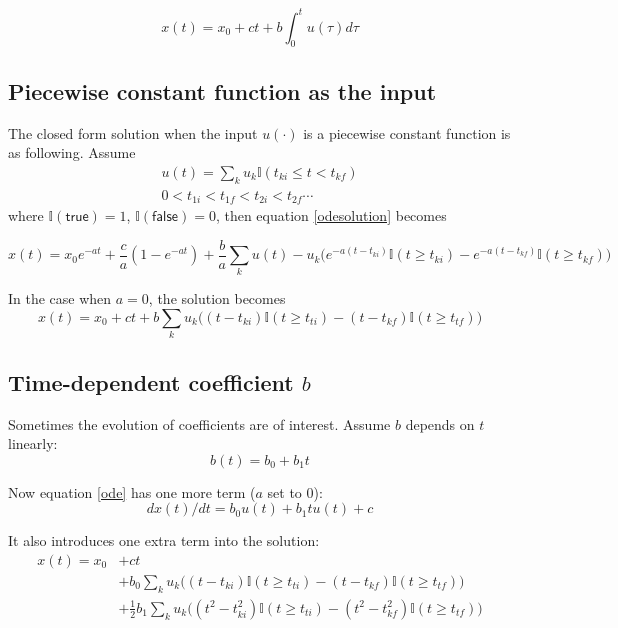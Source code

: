 \begin{equation}
	x(t) = x_0 + ct +  b \int_0^t u(\tau)d\tau
\end{equation}


\subsection{Piecewise constant function as the input}
The closed form solution when the input $u(\cdot)$ is a piecewise constant function is as following. Assume
\begin{equation}
	\begin{split}
u(t) = \sum_k u_k  \mathbb{I}(t_{ki}\leqslant t < t_{kf}) \\ 
0 < t_{1i} < t_{1f} < t_{2i} < t_{2f} \cdots
	\end{split}
\end{equation}
where $\mathbb{I}(\textsf{true}) = 1$, $\mathbb{I}(\textsf{false}) = 0$, then equation \ref{odesolution} becomes

\begin{equation}
	x(t) = x_0 e^{-at} + \frac{c}{a}(1-e^{-at}) + \frac{b}{a} \sum_k u(t) - u_k\bigg(e^{-a(t-t_{ki})}\mathbb{I}(t\geqslant t_{ki}) - e^{-a(t-t_{kf})}\mathbb{I}(t\geqslant t_{kf})\bigg)
\end{equation}

In the case when $a=0$, the solution becomes
\begin{equation}
	x(t) = x_0 + ct +  b \sum_k u_k\big( (t-t_{ki}) \mathbb{I}(t\geqslant t_{ti}) - (t-t_{kf}) \mathbb{I}(t\geqslant t_{tf})\big)
\end{equation}

\subsection{Time-dependent coefficient $b$}

Sometimes the evolution of coefficients are of interest. Assume $b$ depends on $t$ linearly:
\begin{equation}
	b(t) = b_0 + b_1 t
\end{equation}

Now equation \ref{ode} has one more term ($a$ set to $0$):
\begin{equation}
dx(t)/dt = b_0u(t) + b_1tu(t) + c
\end{equation}

It also introduces one extra term into the solution:
\begin{equation}
\begin{split}
	x(t) = x_0 &+ ct \\
	&+ b_0 \sum_k u_k\big( (t-t_{ki}) \mathbb{I}(t\geqslant t_{ti}) - (t-t_{kf}) \mathbb{I}(t\geqslant t_{tf})\big) \\
	&+ \frac{1}{2} b_1 \sum_k u_k\big( (t^2-t^2_{ki}) \mathbb{I}(t\geqslant t_{ti}) - (t^2-t^2_{kf}) \mathbb{I}(t\geqslant t_{tf})\big)
\end{split}
\end{equation}

